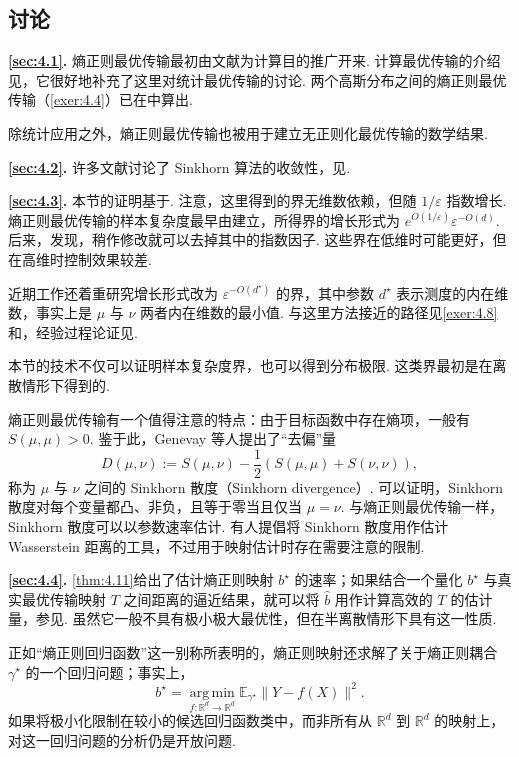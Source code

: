 \subsection{讨论}\label{sec:4.5}
\noindent\textbf{\autoref{sec:4.1}.} 熵正则最优传输最初由文献\cite{ref97}为计算目的推广开来. 计算最优传输的介绍见\cite{ref257}，它很好地补充了这里对统计最优传输的讨论. 两个高斯分布之间的熵正则最优传输（\autoref{exer:4.4}）已在\cite{ref168,ref219}中算出.

除统计应用之外，熵正则最优传输也被用于建立无正则化最优传输的数学结果\cite{ref78,ref131,ref141}.

\noindent\textbf{\autoref{sec:4.2}.} 许多文献讨论了 Sinkhorn 算法的收敛性，见\cite{ref12,ref24,ref32,ref86,ref102,ref128,ref146,ref156,ref172,ref204}.

\noindent\textbf{\autoref{sec:4.3}.} 本节的证明基于\cite{ref272}. 注意，这里得到的界无维数依赖，但随 $1/\varepsilon$ 指数增长. 熵正则最优传输的样本复杂度最早由\cite{ref140}建立，所得界的增长形式为 $e^{O(1/\varepsilon)}\varepsilon^{-O(d)}$. 后来，\cite{ref228}发现，稍作修改就可以去掉其中的指数因子. 这些界在低维时可能更好，但在高维时控制效果较差.

近期工作还着重研究增长形式改为 $\varepsilon^{-O(d^\star)}$ 的界，其中参数 $d^\star$ 表示测度的内在维数，事实上是 $\mu$ 与 $\nu$ 两者内在维数的最小值. 与这里方法接近的路径见\autoref{exer:4.8}和\cite{ref292}，经验过程论证见\cite{ref157}.

本节的技术不仅可以证明样本复杂度界，也可以得到分布极限\cite{ref106,ref153,ref228}. 这类界最初是在离散情形下得到的\cite{ref36,ref177}.

熵正则最优传输有一个值得注意的特点：由于目标函数中存在熵项，一般有 $S(\mu,\mu)>0$. 鉴于此，Genevay 等人\cite{ref139}提出了“去偏”量
$$D(\mu,\nu):=S(\mu,\nu)-\frac12(S(\mu,\mu)+S(\nu,\nu)),$$
称为 $\mu$ 与 $\nu$ 之间的 Sinkhorn 散度（Sinkhorn divergence）. 可以证明，Sinkhorn 散度对每个变量都凸、非负，且等于零当且仅当 $\mu=\nu$\cite{ref132}. 与熵正则最优传输一样，Sinkhorn 散度可以以参数速率估计\cite{ref106,ref140}. 有人提倡将 Sinkhorn 散度用作估计 Wasserstein 距离的工具\cite{ref85}，不过用于映射估计时存在需要注意的限制\cite{ref263}.

\noindent\textbf{\autoref{sec:4.4}.} \autoref{thm:4.11}给出了估计熵正则映射 $b^\star$ 的速率；如果结合一个量化 $b^\star$ 与真实最优传输映射 $T$ 之间距离的逼近结果，就可以将 $\widehat b$ 用作计算高效的 $T$ 的估计量，参见\cite{ref262}. 虽然它一般不具有极小极大最优性，但在半离散情形下具有这一性质\cite{ref264}.

正如“熵正则回归函数”这一别称所表明的，熵正则映射还求解了关于熵正则耦合 $\gamma^\star$ 的一个回归问题；事实上，
$$b^\star=\operatorname*{arg\,min}_{f:\mathbb R^d\to\mathbb R^d}
\mathbb E_{\gamma^\star}\|Y-f(X)\|^2.$$
如果将极小化限制在较小的候选回归函数类中，而非所有从 $\mathbb R^d$ 到 $\mathbb R^d$ 的映射上，对这一回归问题的分析仍是开放问题.
